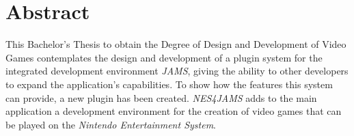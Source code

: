 \chapter{Abstract} \label{ch:abstract}

This Bachelor's Thesis to obtain the Degree of Design
and Development of Video Games contemplates the design
and development of a plugin system for the integrated
development environment \textit{JAMS},
giving the ability to other developers to expand the
application's capabilities.
To show how the features this system can provide,
a new plugin has been created.
\textit{NES4JAMS} adds to the main application
a development environment for the creation of
video games that can be played on the
\textit{Nintendo Entertainment System}.